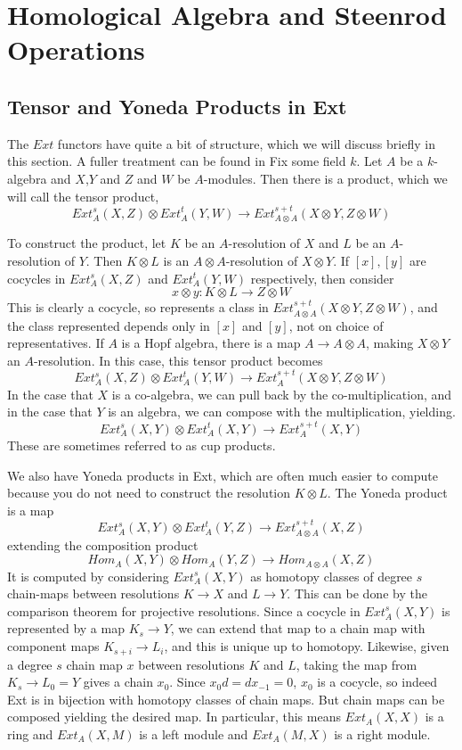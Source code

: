 

\section{Homological Algebra and Steenrod Operations}

\subsection{Tensor and Yoneda Products in Ext}
\label{sec:ExtStructure}

The $Ext$ functors have quite a bit of structure, which we will discuss briefly in this section.  A fuller treatment can be found in \cite{cartan}
Fix some field $k$. 
Let $A$ be a $k$-algebra and $X$,$Y$ and $Z$ and $W$ be $A$-modules.
Then there is a product, which we will call the tensor product, 
\[Ext^s_A(X,Z)\otimes Ext^t_A(Y,W)\to Ext^{s+t}_{A\otimes A}(X\otimes Y,Z\otimes W)\]

To construct the product, let $K$ be an  $A$-resolution of $X$ and $L$ be an  $A$-resolution of $Y$.  
Then $K\otimes L$ is an $A\otimes A$-resolution of $X\otimes Y$.  
If $[x],[y]$ are cocycles in $Ext^s_A(X,Z)$ and $Ext^t_A(Y,W)$ respectively, then consider
\[x\otimes y : K\otimes L \to Z\otimes W\]
This is clearly a cocycle, so represents a class in $Ext^{s+t}_{A\otimes A}(X\otimes Y,Z\otimes W)$, and the class represented depends only in $[x]$ and $[y]$, not on choice of representatives. If $A$ is a Hopf algebra, there is a map $A\to A\otimes A$, making $X\otimes Y$ an $A$-resolution.  In this case, this tensor product becomes
\[Ext^s_A(X,Z)\otimes Ext^t_A(Y,W)\to Ext^{s+t}_{A}(X\otimes Y,Z\otimes W)\]
In the case that $X$ is a co-algebra, we can pull back by the co-multiplication, and in the case that $Y$ is an algebra, we can compose with the multiplication, yielding.  
\[Ext^s_A(X,Y)\otimes Ext^t_A(X,Y)\to Ext^{s+t}_{A}(X,Y)\]
These are sometimes referred to as cup products.  

We also have Yoneda products in Ext, which are often much easier to compute because you do not need to construct the resolution $K\otimes L$.  
The Yoneda product is a map
\[Ext^s_A(X,Y)\otimes Ext^t_A(Y,Z)\to Ext^{s+t}_{A\otimes A}(X,Z)\]
extending the composition product
\[Hom_A(X,Y)\otimes Hom_A(Y,Z)\to Hom_{A\otimes A}(X,Z)\]
It is computed by considering $Ext^s_A(X,Y)$ as homotopy classes of degree $s$ chain-maps between resolutions $K\to X$ and $L\to Y$.  
This can be done by the comparison theorem for projective resolutions.  
Since a cocycle in $Ext^s_A(X,Y)$ is represented by a map $K_s\to Y$, we can extend that map to a chain map with component maps $K_{s+i}\to L_i$, and this is unique up to homotopy.  
Likewise, given a degree $s$ chain map $x$ between resolutions $K$ and $L$, taking the map from $K_s\to L_0=Y$ gives a chain $x_0$.  Since $x_0d=dx_{-1}=0$, $x_0$ is a cocycle, so indeed Ext is in bijection with homotopy classes of chain maps.  
But chain maps can be composed yielding the desired map.
In particular, this means $Ext_A(X,X)$ is a ring and $Ext_A(X,M)$ is a left module and $Ext_A(M,X)$ is a right module.  



